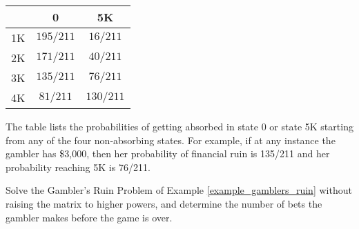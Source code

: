 \begin{center}
    \begin{tabular}{c|cc}
           & 0         & 5K        \\
        \hline
        1K & $195/211$ & $16/211$  \\
        2K & $171/211$ & $40/211$  \\
        3K & $135/211$ & $76/211$  \\
        4K & $81/211$  & $130/211$ \\
    \end{tabular}
\end{center}

The table lists the probabilities of getting absorbed in state 0 or state 5K starting from any of the four non-absorbing states. For example, if at any instance the gambler has \$3,000, then her probability of financial ruin is 135/211 and her probability reaching 5K is 76/211.


\begin{example}
    Solve the Gambler's Ruin Problem of Example \ref{example_gamblers_ruin} without raising the matrix to higher powers, and determine the number of bets the gambler makes before the game is over.
\end{example}

